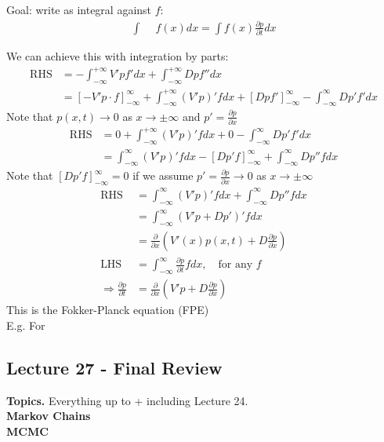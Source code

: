 \documentclass[12pt, letterpaper]{article}
\begin{document}
Goal: write as integral against $f$:
\begin{align*}
    \int \boxed{\quad}\ f(x)dx = \int f(x) \frac{\partial p}{\partial t}dx
\end{align*}

We can achieve this with integration by parts:
\begin{align*}
    \text{RHS} &= -\int_{-\infty}^{+\infty} V'pf'dx + \int_{-\infty}^{+\infty} Dpf''dx \\
    &= [-V'p\cdot f]^\infty_{-\infty} + \int_{-\infty}^{+\infty} (V'p)'fdx + [Dpf']^\infty_{-\infty} - \int_{-\infty}^{\infty} Dp'f'dx
\end{align*}
Note that $p(x,t) \rightarrow 0$ as $x \rightarrow \pm \infty$ and $p' = \frac{\partial p}{\partial x}$
\begin{align*}
    \text{RHS} &= 0 + \int_{-\infty}^{+\infty} (V'p)'fdx + 0 - \int_{-\infty}^{\infty} Dp'f'dx \\
    &= \int_{-\infty}^{\infty}(V'p)'fdx - [Dp'f]^\infty_{-\infty} + \int_{-\infty}^{\infty}Dp''fdx
\end{align*}
Note that $[Dp'f]^\infty_{-\infty} = 0$ if we assume $p' = \frac{\partial p}{\partial x} \rightarrow 0$ 
as $x \rightarrow \pm \infty$
\begin{align*}
    \text{RHS} &= \int_{-\infty}^{\infty}(V'p)'fdx + \int_{-\infty}^{\infty}Dp''fdx \\
    &= \int_{-\infty}^{\infty}(V'p+Dp')'fdx \\
    &= \frac{\partial}{\partial x} (V'(x)p(x,t) + D \frac{\partial p}{\partial x}) \\
    \text{LHS} &= \int_{-\infty}^{\infty} \frac{\partial p}{\partial t} fdx, \quad \text{for any }f \\
    \Rightarrow \frac{\partial p}{\partial t} &= \frac{\partial}{\partial x} (V'p + D \frac{\partial p}{\partial x})
\end{align*}
This is the Fokker-Planck equation (FPE) \\
E.g. For 

\subsection{Lecture 27 - Final Review}
\textbf{Topics.} Everything up to + including Lecture 24. \\
\textbf{Markov Chains} \\

\textbf{MCMC} \\
\end{document}
